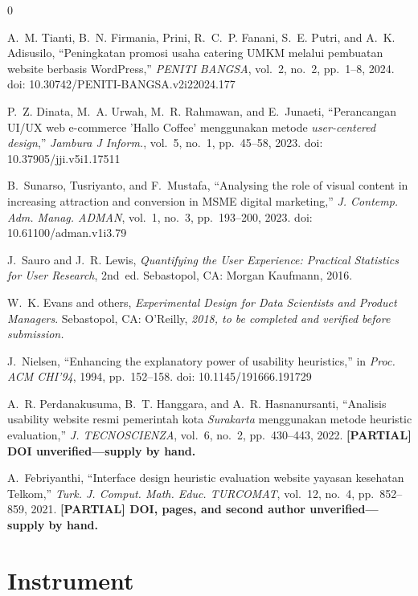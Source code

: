 \documentclass[conference]{IEEEtran}
\begin{document}
\begin{thebibliography}{0}

A.~M. Tianti, B.~N. Firmania, Prini, R.~C.~P. Fanani, S.~E. Putri, and
A.~K. Adisusilo, ``Peningkatan promosi usaha catering UMKM melalui pembuatan
website berbasis WordPress,'' \textit{PENITI BANGSA}, vol.~2, no.~2, pp.~1--8,
2024. doi: 10.30742/PENITI-BANGSA.v2i22024.177

P.~Z. Dinata, M.~A. Urwah, M.~R. Rahmawan, and E.~Junaeti, ``Perancangan
UI/UX web e-commerce 'Hallo Coffee' menggunakan metode \emph{user-centered
design},'' \textit{Jambura J Inform.}, vol.~5, no.~1, pp.~45--58, 2023.
doi: 10.37905/jji.v5i1.17511

B.~Sunarso, Tusriyanto, and F.~Mustafa, ``Analysing the role of visual content
in increasing attraction and conversion in MSME digital marketing,''
\textit{J. Contemp. Adm. Manag. ADMAN}, vol.~1, no.~3, pp.~193--200, 2023.
doi: 10.61100/adman.v1i3.79

J.~Sauro and J.~R. Lewis, \emph{Quantifying the User Experience: Practical
Statistics for User Research}, 2nd~ed. Sebastopol, CA: Morgan Kaufmann, 2016.

W.~K. Evans and others, \emph{Experimental Design for Data Scientists and
Product Managers}. Sebastopol, CA: O'Reilly, \emph{2018, to be completed and
verified before submission.}

J.~Nielsen, ``Enhancing the explanatory power of usability heuristics,''
in \emph{Proc. ACM CHI'94}, 1994, pp.~152--158.
doi: 10.1145/191666.191729

A.~R. Perdanakusuma, B.~T. Hanggara, and A.~R. Hasnanursanti, ``Analisis
usability website resmi pemerintah kota \emph{Surakarta} menggunakan metode
heuristic evaluation,'' \textit{J. TECNOSCIENZA}, vol.~6, no.~2,
pp.~430--443, 2022. \textbf{[PARTIAL] DOI unverified---supply by hand.}

A.~Febriyanthi, ``Interface design heuristic evaluation website yayasan
kesehatan Telkom,'' \textit{Turk. J. Comput. Math. Educ. TURCOMAT},
vol.~12, no.~4, pp.~852--859, 2021. \textbf{[PARTIAL] DOI, pages, and second
author unverified---supply by hand.}

\end{thebibliography}

\appendix

\section{Instrument}
\end{document}
